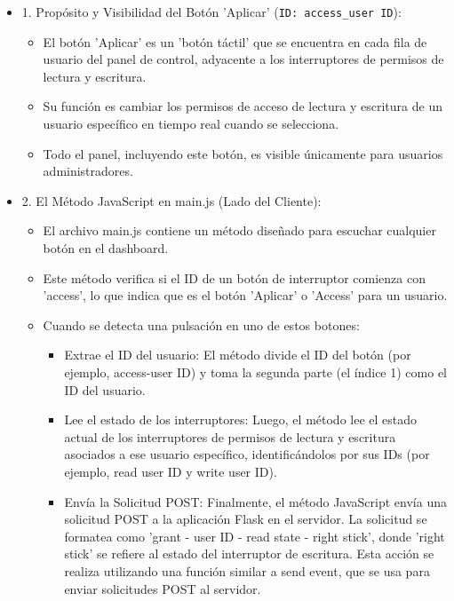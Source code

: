 \documentclass{report}
\begin{document}
\begin{itemize}
    \item 1. Propósito y Visibilidad del Botón 'Aplicar' (\verb|ID: access_user ID|):
        \begin{itemize}
            \item El botón 'Aplicar' es un 'botón táctil' que se encuentra en cada fila de usuario del panel de control, adyacente a los interruptores de 
            permisos de lectura y escritura.
            \item Su función es cambiar los permisos de acceso de lectura y escritura de un usuario específico en tiempo real cuando se selecciona.
            \item Todo el panel, incluyendo este botón, es visible únicamente para usuarios administradores.        
        \end{itemize}
    \item 2. El Método JavaScript en main.js (Lado del Cliente):
        \begin{itemize}
            \item El archivo main.js contiene un método diseñado para escuchar cualquier botón en el dashboard.
            \item Este método verifica si el ID de un botón de interruptor comienza con 'access', lo que indica que es el botón 'Aplicar' o 'Access' para un usuario.
            \item Cuando se detecta una pulsación en uno de estos botones:
                \begin{itemize}
                    \item Extrae el ID del usuario: El método divide el ID del botón (por ejemplo, access-user ID) y toma la segunda parte (el índice 1) como el ID del usuario.
                    \item Lee el estado de los interruptores: Luego, el método lee el estado actual de los interruptores de permisos de lectura y escritura asociados a ese usuario específico, identificándolos por sus IDs (por ejemplo, read user ID y write user ID).
                    \item Envía la Solicitud POST: Finalmente, el método JavaScript envía una solicitud POST a la aplicación Flask en el servidor. La solicitud se formatea como 'grant - user ID - read state - right stick', donde 'right stick' se refiere al estado del interruptor de escritura. Esta acción se realiza utilizando una función similar a send event, que se usa para enviar solicitudes POST al servidor.
                \end{itemize}

\end{itemize}
\end{itemize}
\end{document}
